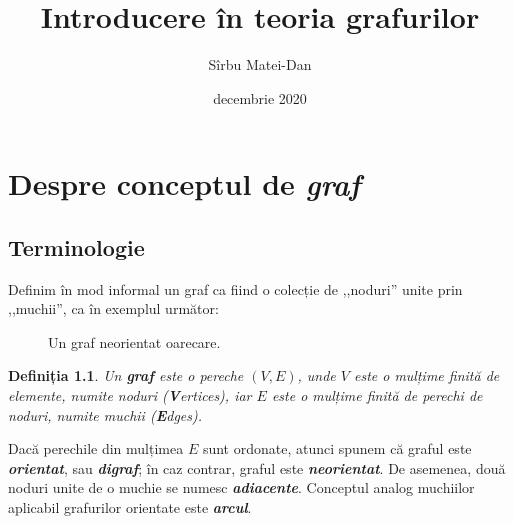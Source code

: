 \documentclass[9pt,a4paper]{report}
\title{\bf Introducere în teoria grafurilor}
\author{Sîrbu Matei-Dan}
\date{decembrie 2020}
\newtheorem{definitie}{Definiția}
\begin{document}
\maketitle

\newpage

\chapter{Despre conceptul de \textit{graf}}
\section{Terminologie}

Definim în mod informal un graf ca fiind o colecție de ,,noduri'' unite prin ,,muchii'', ca în exemplul următor:

\begin{figure}[htbp]
    \centering
    \caption{Un graf neorientat oarecare.}
    \label{fig:graf1}
\end{figure}

\begin{definitie}
    Un \textbf{graf} este o pereche $(V,E)$, unde $V$ este o mulțime finită de elemente, numite \textit{noduri (\textbf{V}ertices)}, iar $E$ este o mulțime finită de perechi de noduri, numite \textit{muchii (\textbf{E}dges)}.
\end{definitie}

Dacă perechile din mulțimea $E$ sunt ordonate, atunci spunem că graful este \textbf{\textit{orientat}}, sau \textbf{\textit{digraf}}; în caz contrar, graful este \textbf{\textit{neorientat}}. De asemenea, două noduri unite de o muchie se numesc \textit{\textbf{adiacente}}. Conceptul analog muchiilor aplicabil grafurilor orientate este \textbf{\textit{arcul}}.
\end{document}
